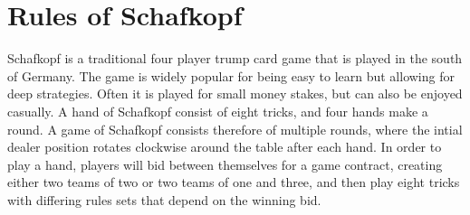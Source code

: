 \section{Rules of Schafkopf}
Schafkopf is a traditional four player trump card game that is played in the south of Germany.
The game is widely popular for being easy to learn but allowing for deep strategies.
Often it is played for small money stakes, but can also be enjoyed casually.
A hand of Schafkopf consist of eight tricks, and four hands make a round.
A game of Schafkopf consists therefore of multiple rounds, where the intial dealer position rotates
clockwise around the table after each hand.
In order to play a hand, players will bid between themselves for a game contract, creating either two teams of two or
two teams of one and three, and then play eight tricks with differing rules sets that depend on the winning bid.

